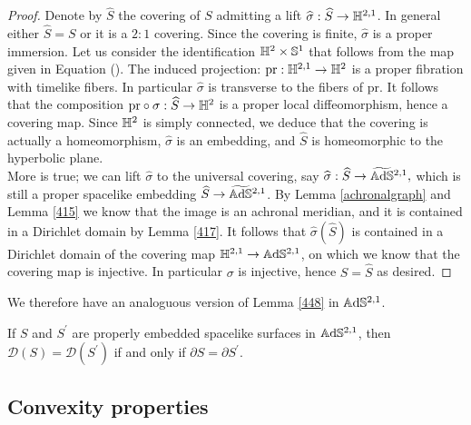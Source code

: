\begin{proof}

    Denote by $\widehat{S}$ the covering of $S$ admitting a lift $\widehat{\sigma}:\widehat{S}\to\mathbb{H}^{2,1}$. In general either $\widehat{S}=S$ or it is a $2:1$ covering. Since the covering is finite, $\widehat{\sigma}$ is a proper immersion. Let us consider the identification $\mathbb{H}^2\times\mathbb{S}^1$ that follows from the map given in Equation (). The induced projection: $\text{pr}:\mathbb{H}^{2,1}\to\mathbb{H}^2$ is a proper fibration with timelike fibers. In particular $\widehat{\sigma}$ is transverse to the fibers of $\text{pr}.$ It follows that the composition $\text{pr}\circ\sigma:\widehat{S}\to\mathbb{H}^2$ is a proper local diffeomorphism, hence a covering map. Since $\mathbb{H}^2$ is simply connected, we deduce that the covering is actually a homeomorphism, $\widehat{\sigma}$ is an embedding, and $\widehat{S}$ is homeomorphic to the hyperbolic plane. \\
    More is true; we can lift $\widehat{\sigma}$ to the universal covering, say $\widehat{\sigma}:\widehat{S}\to\widetilde{\mathbb{A}\mathrm{d}\mathbb{S}}{}^{2,1},$ which is still a proper spacelike embedding $\widehat{S}\to \widetilde{\mathbb{A}\mathrm{d}\mathbb{S}}{}^{2,1}$. By Lemma \ref{achronalgraph} and Lemma \ref{415} we know that the image is an achronal meridian, and it is contained in a Dirichlet domain by Lemma \ref{417}. It follows that $\widehat{\sigma}(\widehat{S})$ is contained in a Dirichlet domain of the covering map $\mathbb{H}^{2,1}\to\mathbb{A}\mathrm{d}\mathbb{S}^{2,1}$, on which we know that the covering map is injective. In particular $\sigma$ is injective, hence $S=\widehat{S}$ as desired.  
\end{proof}


We therefore have an analoguous version of Lemma \ref{448} in $\mathbb{A}\mathrm{d}\mathbb{S}^{2,1}$.

\begin{corollary}
    If $S$ and $S^{\prime}$ are properly embedded spacelike surfaces in $\mathbb{A}\mathrm{d}\mathbb{S}^{2,1}$, then $\mathcal{D}(S)=\mathcal{D}(S^{\prime})$ if and only if $\partial S=\partial S^{\prime}$. 
\end{corollary}

\subsection{Convexity properties}

